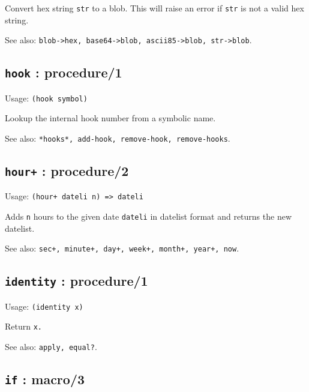 \documentclass[
]{article}
\newcommand{\passthrough}[1]{#1}
\begin{document}
Convert hex string \passthrough{\lstinline!str!} to a blob. This will
raise an error if \passthrough{\lstinline!str!} is not a valid hex
string.

See also:
\passthrough{\lstinline!blob->hex, base64->blob, ascii85->blob, str->blob!}.

\hypertarget{hook-procedure1-1}{%
\subsection{\texorpdfstring{\texttt{hook} :
procedure/1}{hook : procedure/1}}\label{hook-procedure1-1}}

Usage: \passthrough{\lstinline!(hook symbol)!}

Lookup the internal hook number from a symbolic name.

See also:
\passthrough{\lstinline!*hooks*, add-hook, remove-hook, remove-hooks!}.

\hypertarget{hour-procedure2-1}{%
\subsection{\texorpdfstring{\texttt{hour+} :
procedure/2}{hour+ : procedure/2}}\label{hour-procedure2-1}}

Usage: \passthrough{\lstinline!(hour+ dateli n) => dateli!}

Adds \passthrough{\lstinline!n!} hours to the given date
\passthrough{\lstinline!dateli!} in datelist format and returns the new
datelist.

See also:
\passthrough{\lstinline!sec+, minute+, day+, week+, month+, year+, now!}.

\hypertarget{identity-procedure1-1}{%
\subsection{\texorpdfstring{\texttt{identity} :
procedure/1}{identity : procedure/1}}\label{identity-procedure1-1}}

Usage: \passthrough{\lstinline!(identity x)!}

Return \passthrough{\lstinline!x.!}

See also: \passthrough{\lstinline!apply, equal?!}.

\hypertarget{if-macro3-1}{%
\subsection{\texorpdfstring{\texttt{if} :
macro/3}{if : macro/3}}\label{if-macro3-1}}
\end{document}
